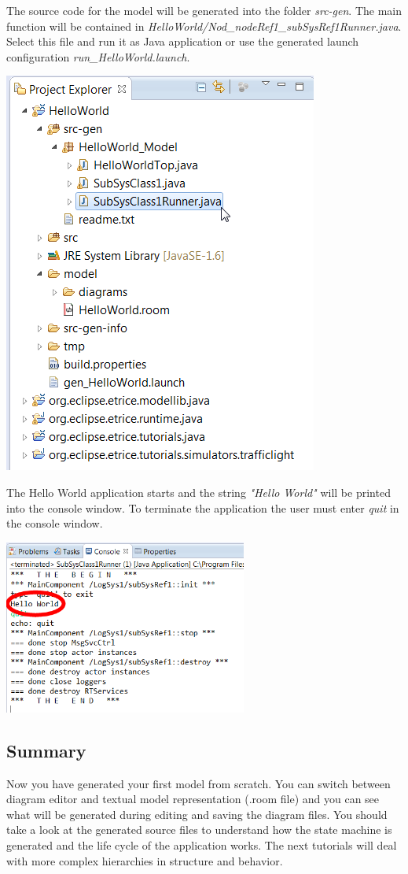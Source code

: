 The source code for the model will be generated into the folder \emph{src-gen}. The main function will be contained in \emph{HelloWorld/Nod\_nodeRef1\_subSysRef1Runner.java}.
Select this file and run it as Java application or use the generated launch configuration \emph{run\_HelloWorld.launch}.

\includegraphics{images/015-HelloWorld07.png}


The Hello World application starts and the string \emph{"Hello World"} will be printed into the console window. To terminate the application the user must enter \emph{quit} in the console window.

\includegraphics[width=0.6\textwidth]{images/015-HelloWorld08.png}



\subsection{Summary}

Now you have generated your first \eTrice{} model from scratch. You can switch between diagram editor and 
textual model representation (.room file) and you can see what will be generated during editing and saving the diagram files. 
You should take a look at the generated source files to understand how the state machine is generated and 
the life cycle of the application works. The next tutorials will deal with more complex hierarchies in structure and behavior.
